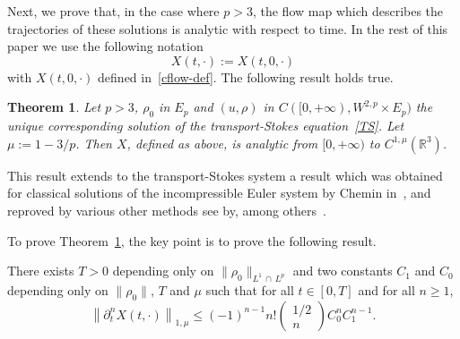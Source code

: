 \documentclass[10pt]{amsart}
\newtheorem{theo}{Theorem}[section]
\theoremstyle{definition}\newtheorem{defi}[theo]{Definition}\newtheorem{rema}[theo]{Remark}\newtheorem{exam}[theo]{Example}\newtheorem{exem}[theo]{Example}\newtheorem{nota}[theo]{Notation}
\newcommand{\R}{\mathbb{R}}
\renewcommand{\leq}{\leqslant}
\renewcommand{\geq}{\geqslant}
\begin{document}
Next, we prove that, in the case where $p>3$, the flow map which describes the trajectories of these solutions is analytic with respect to time. In the rest of this paper we use the following notation
\[
X(t,\cdot):=X(t,0,\cdot)
\]
with $X(t,0,\cdot)$ defined in~\eqref{cflow-def}. The following result holds true.

\begin{theo}\label{analytic}
Let $p>3$, $\rho_0$ in $E_p$ and $ (u,\rho)$ in $C([0,+\infty),W^{2,p} \times E_p)$ the unique corresponding solution of the transport-Stokes equation~\eqref{TS}. Let $\mu:=1-3/p$. Then $ X$, defined as above, is analytic from $[0,+\infty)$ to $ C^{1,\mu}(\R^3)$.
\end{theo} This result extends to the transport-Stokes system a result which was obtained for classical solutions of the incompressible Euler system by Chemin in~\cite{Chemin}, and reproved by various other methods see by, among others~\cite{CVW,FZ,Gamblin,ogfstt,Inci,Kato,
Serfati,Shnirelman}.



To prove Theorem~\ref{analytic}, the key point is to prove the following result.

\begin{prop}\label{apana}
There exists $T>0$ depending only on $\|\rho_0\|_{L^1\, \cap\, L^p}$ and two constants $C_1 $ and $C_0$ depending only on $\|\rho_0\|$, $T$ and $\mu$ such that for all $t\in[0,T]$ and for all $n\geq1$,
\begin{equation}\label{rec_formule}
\left\|\partial_t^{n} X(t,\cdot)\right\|_{1,\mu} \leq (-1)^{n-1} n!
\begin{pmatrix}
1/2 \\ n
\end{pmatrix}
C_0^n C_1^{n-1}.
\end{equation}
\end{prop}
\end{document}
